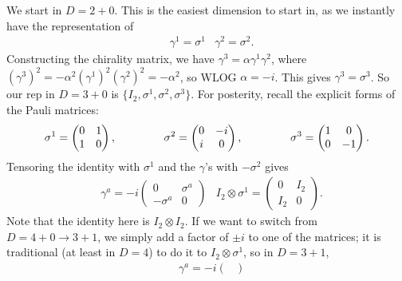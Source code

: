 \documentclass[11pt]{article}
\begin{document}
\begin{eexample}
    [Bootstrapping our way to Heaven ($D = 11$ supergravity)]
    We start in $D = 2 + 0$. This is the easiest dimension to
    start in, as we instantly have the representation of
    \begin{align*}
        & \gamma^1 = \sigma^1 & \gamma^2 = \sigma^2.
    \end{align*}
    Constructing the chirality matrix, we have $\gamma^3 = \alpha \gamma^1 \gamma^2$,
    where $(\gamma^3)^2 = - \alpha^2 (\gamma^1)^2 (\gamma^2)^2 = - \alpha^2$,
    so WLOG $\alpha = -i$. This gives $\gamma^3 = \sigma^3$. So our rep in $D = 3 + 0$
    is $\{ I_2, \sigma^1, \sigma^2, \sigma^3 \}$. For posterity,
    recall the explicit forms of the Pauli matrices:
    \begin{align*}
        \sigma^1 = \begin{pmatrix}
            0 & 1\\
            1 & 0
        \end{pmatrix},
        \hspace{1.5cm}
        \sigma^2 = \begin{pmatrix}
            0 & -i\\
            i & 0
        \end{pmatrix},
        \hspace{1.5cm}
        \sigma^3 = \begin{pmatrix}
            1 & 0\\
            0 & -1
        \end{pmatrix}.
    \end{align*}
    Tensoring the identity
    with $\sigma^1$ and the $\gamma$'s with $-\sigma^2$ gives
    \begin{align*}
        & \gamma^a = -i \begin{pmatrix}
            0 & \sigma^a\\
            - \sigma^a & 0
        \end{pmatrix}
        & I_2 \otimes \sigma^1 = \begin{pmatrix}
            0 & I_2\\
            I_2 & 0
        \end{pmatrix}.
    \end{align*}
    Note that the identity here is $I_2 \otimes I_2$. If we want
    to switch from $D = 4 + 0 \to 3 + 1$, we simply add a factor
    of $\pm i$ to one of the matrices; it is traditional (at least
    in $D = 4$) to do it to $I_2 \otimes \sigma^1$, so in $D = 3 + 1$,
    \begin{align*}
        & \gamma^a = -i \begin{pmatrix}

\end{pmatrix}
\end{align*}
\end{eexample}
\end{document}
